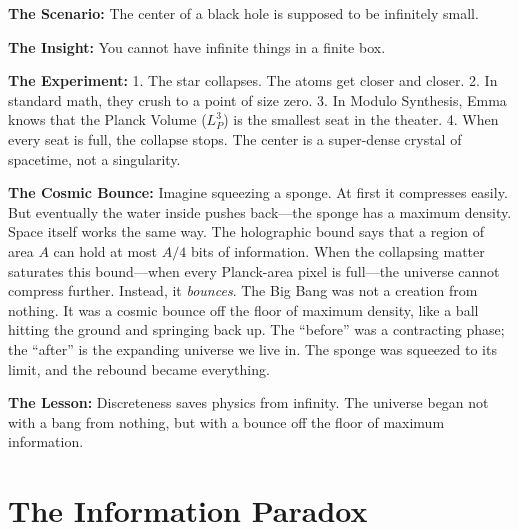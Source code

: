 \documentclass[11pt, a4paper, openany]{book}
\begin{document}
\begin{thoughtexp}
\textbf{The Scenario:} The center of a black hole is supposed to be infinitely small.

\textbf{The Insight:} You cannot have infinite things in a finite box.

\textbf{The Experiment:}
1. The star collapses. The atoms get closer and closer.
2. In standard math, they crush to a point of size zero.
3. In Modulo Synthesis, Emma knows that the Planck Volume ($L_P^3$) is the smallest seat in the theater.
4. When every seat is full, the collapse stops. The center is a super-dense crystal of spacetime, not a singularity.

\textbf{The Cosmic Bounce:} Imagine squeezing a sponge. At first it compresses easily. But eventually the water inside pushes back---the sponge has a maximum density. Space itself works the same way. The holographic bound says that a region of area $A$ can hold at most $A/4$ bits of information. When the collapsing matter saturates this bound---when every Planck-area pixel is full---the universe cannot compress further. Instead, it \emph{bounces}. The Big Bang was not a creation from nothing. It was a cosmic bounce off the floor of maximum density, like a ball hitting the ground and springing back up. The ``before'' was a contracting phase; the ``after'' is the expanding universe we live in. The sponge was squeezed to its limit, and the rebound became everything.

\textbf{The Lesson:} Discreteness saves physics from infinity. The universe began not with a bang from nothing, but with a bounce off the floor of maximum information.
\end{thoughtexp}


\section{The Information Paradox}
\end{document}
